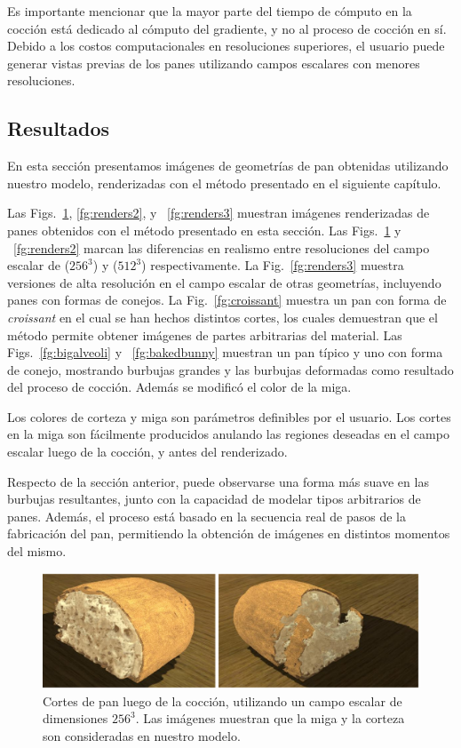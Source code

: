 Es importante mencionar que la mayor parte del tiempo de cómputo en la cocción está dedicado al cómputo del gradiente, y no al proceso de cocción en sí.
Debido a los costos computacionales en resoluciones superiores, el usuario puede generar vistas previas de los panes utilizando campos escalares con menores resoluciones.


\subsection{Resultados}
En esta sección presentamos imágenes de geometrías de pan obtenidas utilizando nuestro modelo, renderizadas con el método presentado en el siguiente capítulo.

Las Figs.~\ref{fg:renders}, \ref{fg:renders2}, y ~\ref{fg:renders3} muestran imágenes renderizadas de panes obtenidos con el método presentado en esta sección.
Las Figs.~\ref{fg:renders} y ~\ref{fg:renders2} marcan las diferencias en realismo entre resoluciones del campo escalar de ($256^{3}$) y  ($512^{3}$) respectivamente.
La Fig.~\ref{fg:renders3} muestra versiones de alta resolución en el campo escalar de otras geometrías, incluyendo panes con formas de conejos.
La Fig.~\ref{fg:croissant} muestra un pan con forma de {\em croissant} en el cual se han hechos distintos cortes, los cuales demuestran que el método permite obtener imágenes de partes arbitrarias del material.
Las Figs.~\ref{fg:bigalveoli} y ~\ref{fg:bakedbunny} muestran un pan típico y uno con forma de conejo, mostrando burbujas grandes y las burbujas deformadas como resultado del proceso de cocción.
Además se modificó el color de la miga.

Los colores de corteza y miga son parámetros definibles por el usuario. Los cortes en la miga son fácilmente producidos anulando las regiones deseadas en el campo escalar luego de la cocción, y antes del renderizado.

Respecto de la sección anterior, puede observarse una forma más suave en las burbujas resultantes, junto con la capacidad de modelar tipos arbitrarios de panes.
Además, el proceso está basado en la secuencia real de pasos de la fabricación del pan, permitiendo la obtención de imágenes en distintos momentos del mismo.


\begin{figure}[!ht]
\begin{center}
\includegraphics[width=13cm]{figures/otherbread}
\caption[Cortes de pan luego de la cocción, utilizando un campo escalar de dimensiones $256^{3}$]{Cortes de pan luego de la cocción, utilizando un campo escalar de dimensiones $256^{3}$. Las imágenes muestran que la miga y la corteza son consideradas en nuestro modelo.}
\label{fg:renders}
\end{center}
\end{figure}

